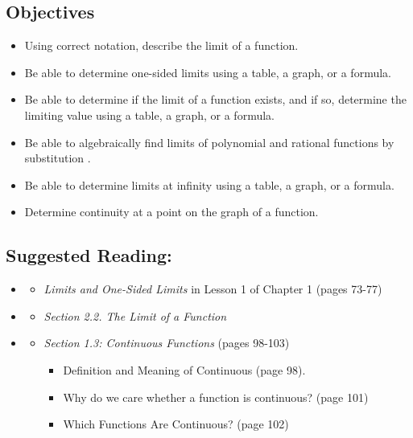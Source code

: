 \vspace{-0.25 in} %
\begin{framed}
\subsection*{Objectives}
\begin{itemize}
    \item Using correct notation, describe the limit of a function.
    \item Be able to determine one-sided limits using a table, a graph, or a formula.
    \item Be able to determine if the limit of a function exists, and if so, determine the limiting value using a table, a graph, or a formula.
    \item Be able to algebraically find limits of polynomial and rational functions by substitution .
    \item Be able to determine limits at infinity using a table, a graph, or a formula.
    \item Determine continuity at a point on the graph of a function.
\end{itemize}

\subsection*{Suggested Reading:}
\begin{itemize}
\item \cite{Calaway}\footnotemark[1]
    \begin{itemize}
        \item \emph{Limits and One-Sided Limits} in Lesson 1 of Chapter 1 (pages 73-77)
        
    \end{itemize}

\item \cite{openstax}\footnotemark[2]
    \begin{itemize}
        \item \emph{Section 2.2. The Limit of a Function}\footnotemark[3]
    \end{itemize}
\item \cite{Hoffman}\footnotemark[4]
    \begin{itemize}
        \item \emph{Section 1.3: Continuous Functions}  (pages 98-103)\footnotemark[3]
        \begin{itemize}
            \item Definition and Meaning of Continuous (page 98).
            \item Why do we care whether a function is continuous? (page 101)
            \item Which Functions Are Continuous? (page 102)
        \end{itemize}
        

\end{itemize}
\end{itemize}
\end{framed}
